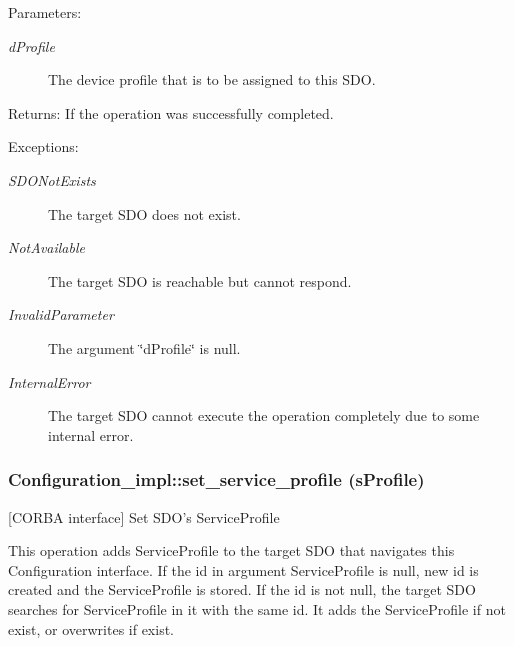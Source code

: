 \begin{Desc}
\item[Parameters:]
\begin{description}
\item[{\em d\-Profile}]The device profile that is to be assigned to this SDO. \end{description}
\end{Desc}
\begin{Desc}
\item[Returns:]If the operation was successfully completed. \end{Desc}
\begin{Desc}
\item[Exceptions:]
\begin{description}
\item[{\em SDONot\-Exists}]The target SDO does not exist. \item[{\em Not\-Available}]The target SDO is reachable but cannot respond. \item[{\em Invalid\-Parameter}]The argument \char`\"{}d\-Profile\char`\"{} is null. \item[{\em Internal\-Error}]The target SDO cannot execute the operation completely due to some internal error.\end{description}
\end{Desc}
\subsubsection{\setlength{\rightskip}{0pt plus 5cm}Configuration\_\-impl::set\_\-service\_\-profile (s\-Profile)}\label{classConfiguration__impl_Configuration__impla2}


[CORBA interface] Set SDO's Service\-Profile 

This operation adds Service\-Profile to the target SDO that navigates this Configuration interface. If the id in argument Service\-Profile is null, new id is created and the Service\-Profile is stored. If the id is not null, the target SDO searches for Service\-Profile in it with the same id. It adds the Service\-Profile if not exist, or overwrites if exist.

